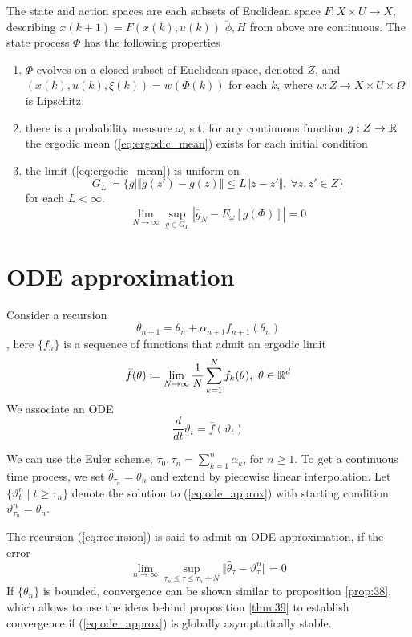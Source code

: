 The state and action spaces are each subsets of Euclidean space \(F:X\times U\to X\), describing \(x(k+1)=F(x(k),u(k))\) 
\(\breve{\phi},H\) from above are continuous. The state process \(\Phi\) has the following properties 
\begin{enumerate}
    \item \(\Phi\) evolves on a closed subset of Euclidean space, denoted \(Z\), and \((x(k),u(k),\xi(k))=w(\Phi(k))\) 
           for each \(k\), where \(w:Z\to X\times U\times \Omega\) is Lipschitz
    \item there is a probability measure \(\omega\), s.t. for any continuous function \(g:Z\to\mathbb{R}\) the ergodic mean (\ref{eq:ergodic_mean}) exists for each initial condition 
    \item the limit (\ref{eq:ergodic_mean}) is uniform on\[G_L\coloneqq \{g\mid\Vert g(z')-g(z)\Vert \leq L\Vert z-z'\Vert,\ \forall z,z'\in Z\}\] for each \(L<\infty\).
        \[\lim_{N\to\infty}\sup_{g\in G_L}|\bar{g}_N-E_\omega[g(\Phi)]|=0\]
\end{enumerate}

\section{ODE approximation}

Consider a recursion \begin{equation}\label{eq:recursion}\theta_{n+1}=\theta_n+\alpha_{n+1}f_{n+1}(\theta_n)\end{equation}, here \(\{f_n\}\) is a 
sequence of functions that admit an ergodic limit 
\[\bar{f}(\theta)\coloneqq \lim_{N\to\infty}\frac{1}{N}\sum_{k=1}^N f_k(\theta),\ \theta\in\R^d\]
We associate an ODE 
 \begin{equation}\label{eq:ode_approx}
    \frac{d}{dt}\vartheta_t=\bar{f}(\vartheta_t)
\end{equation}

We can use the Euler scheme, \(\tau_0,\tau_n=\sum_{k=1}^n\alpha_k\), for \(n\geq 1\).
To get a continuous time process, we set \(\hat{\theta}_{\tau_n}=\theta_n\) and 
extend by piecewise linear interpolation. Let \(\{\vartheta_t^n\mid t\geq \tau_n\}\) denote the solution to 
(\ref{eq:ode_approx}) with starting condition \(\vartheta_{\tau_n}^n=\theta_n\).

The recursion (\ref{eq:recursion}) is said to admit an ODE approximation, if the error
\[\lim_{n\to\infty}\sup_{\tau_n\leq \tau\leq \tau_n+N}\Vert \hat{\theta}_\tau-\vartheta_\tau^n\Vert=0\]
If \(\{\theta_n\}\) is bounded, 
convergence can be shown similar to proposition \ref{prop:38}, which allows 
to use the ideas behind proposition \ref{thm:39}%
to establish convergence if (\ref{eq:ode_approx})
is globally asymptotically stable.

